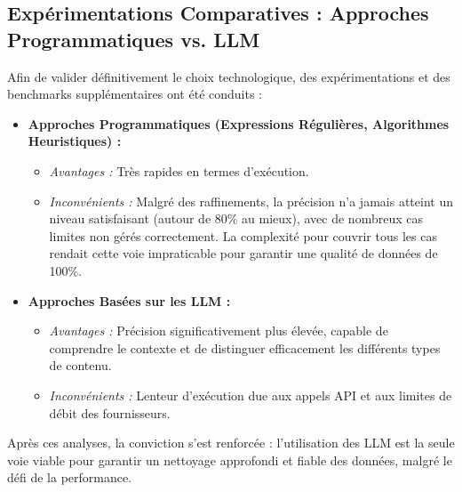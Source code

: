 \documentclass[12pt, a4paper]{article}
\begin{document}
\subsection{Expérimentations Comparatives : Approches Programmatiques vs. LLM}
Afin de valider définitivement le choix technologique, des expérimentations et des benchmarks supplémentaires ont été conduits :
\begin{itemize}
    \item \textbf{Approches Programmatiques (Expressions Régulières, Algorithmes Heuristiques) :}
    \begin{itemize}
        \item \textit{Avantages :} Très rapides en termes d'exécution.
        \item \textit{Inconvénients :} Malgré des raffinements, la précision n'a jamais atteint un niveau satisfaisant (autour de 80\% au mieux), avec de nombreux cas limites non gérés correctement. La complexité pour couvrir tous les cas rendait cette voie impraticable pour garantir une qualité de données de 100\%.
    \end{itemize}
    \item \textbf{Approches Basées sur les LLM :}
    \begin{itemize}
        \item \textit{Avantages :} Précision significativement plus élevée, capable de comprendre le contexte et de distinguer efficacement les différents types de contenu.
        \item \textit{Inconvénients :} Lenteur d'exécution due aux appels API et aux limites de débit des fournisseurs.
    \end{itemize}
\end{itemize}
Après ces analyses, la conviction s'est renforcée : l'utilisation des LLM est la seule voie viable pour garantir un nettoyage approfondi et fiable des données, malgré le défi de la performance.
\end{document}
